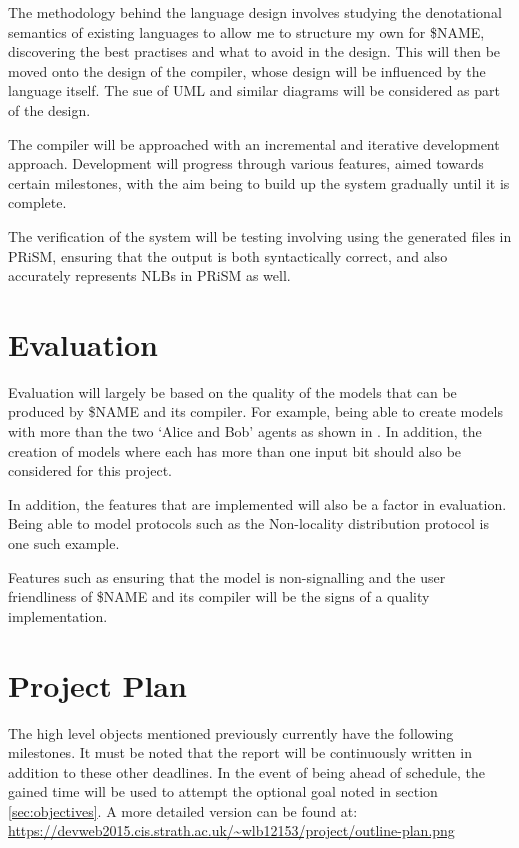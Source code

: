 \documentclass[11pt, a4paper]{article}
\begin{document}
The methodology behind the language design involves studying the denotational
semantics of existing languages to allow me to structure my own for \$NAME,
discovering the best practises and what to avoid in the design. This will then
be moved onto the design of the compiler, whose design will be influenced by the
language itself. The sue of UML and similar diagrams will be considered as part
of the design.

The compiler will be approached with an incremental and iterative development
approach. Development will progress through various features, aimed towards
certain milestones, with the aim being to build up the system gradually until it
is complete.

The verification of the system will be testing involving using the generated
files in PRiSM, ensuring that the output is both syntactically correct, and also
accurately represents NLBs in PRiSM as well.


\section{Evaluation} %
\label{sec:evaluation}
Evaluation will largely be based on the quality of the models that can be
produced by \$NAME and its compiler. For example, being able to create models
with more than the two `Alice and Bob' agents as shown in 
\cite[Definition~1]{nlb_lamontague}. In addition, the creation of models where
each has more than one input bit should also be considered for this project.

In addition, the features that are implemented will also be a factor in
evaluation. Being able to model protocols such as the Non-locality distribution
protocol \cite[Definition~16]{nlb_lamontague} is one such example.

Features such as ensuring that the model is non-signalling and the user
friendliness of \$NAME and its compiler will be the signs of a quality
implementation.


\section{Project Plan} %
\label{sec:project_plan}
The high level objects mentioned previously currently have the following
milestones. It must be noted that the report will be continuously written in
addition to these other deadlines. In the event of being ahead of schedule, the
gained time will be used to attempt the optional goal noted in section
\ref{sec:objectives}. A more detailed version can be found at:
\url{https://devweb2015.cis.strath.ac.uk/~wlb12153/project/outline-plan.png}
\end{document}
